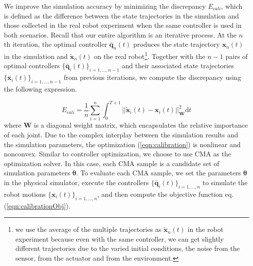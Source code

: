 We improve the simulation accuracy by minimizing the discrepancy $E_{cali}$, which is defined as the difference between the state trajectories in the simulation and those collected in the real robot experiment when the same controller is used in both scenarios. Recall that our entire algorithm is an iterative process. At the $n$th iteration, the optimal controller $\bar{\mathbf{q}}_n(t)$ produces the state trajectory $\mathbf{x}_n(t)$ in the simulation and $\tilde{\mathbf{x}}_n(t)$ on the real robot\footnote{we use the average of the multiple trajectories as $\tilde{\mathbf{x}}_n(t)$ in the robot experiment because even with the same controller, we can get slightly different trajectories due to the varied initial conditions, the noise from the sensor, from the actuator and from the environment.}. Together with the $n-1$ pairs of optimal controllers $\{\bar{\mathbf{q}}_i(t)\}_{i=1,...,n-1}$ and their associated state trajectories $\{\bar{\mathbf{x}}_i(t)\}_{i=1,...,n-1}$ from previous iterations, we compute the discrepancy using the following expression. 

\begin{equation}
  E_{cali}=\frac{1}{n}\sum_{i=1}^{n}\int_{0}^{T+1}||\tilde{\mathbf{x}}_i(t)-\mathbf{x}_i(t)||_{\mathbf{W}}^2\mathrm{d}t
  \label{eqn:calibrationObj}
\end{equation}
where $\mathbf{W}$ is a diagonal weight matrix, which encapsulates the relative importance of each joint. Due to the complex interplay between the simulation results and the simulation parameters, the optimization (\ref{eqn:calibration}) is nonlinear and nonconvex. Similar to controller optimization, we choose to use CMA as the optimization solver. In this case, each CMA sample is a candidate set of simulation parameters $\mathbf{\theta}$. To evaluate each CMA sample, we set the parameters $\mathbf{\theta}$ in the physical simulator, execute the controllers $\{\bar{\mathbf{q}}_i(t)\}_{i=1,...,n}$ to simulate the robot motions $\{\mathbf{x}_i(t)\}_{i=1,...,n}$, and then compute the objective function eq. (\ref{eqn:calibrationObj}).

